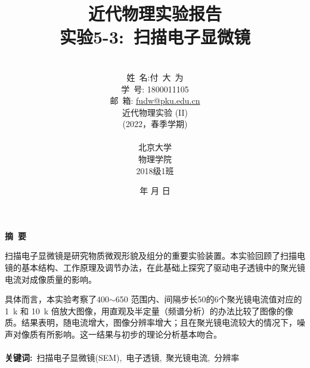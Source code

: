 \documentclass[a4paper]{article}
\begin{document}
\renewcommand{\contentsname}{目\ 录}
\renewcommand{\appendixname}{附录}
\renewcommand{\appendixpagename}{附录}
\renewcommand{\refname}{参考文献} 
\renewcommand{\figurename}{图}
\renewcommand{\tablename}{表}
\renewcommand{\today}{\number\year 年 \number\month 月 \number\day 日}
\newcommand{\refeq}[1]{\textbf{Eq.(\ref{#1})}}
\newcommand*{\circled}[1]{\lower.7ex\hbox{\tikz\draw (0pt, 0pt)%
    circle (.5em) node {\makebox[1em][c]{\small #1}};}}
    
\title{{\Huge 近代物理实验报告{\large\linebreak\\}}{\Large 实验5-3:\ 扫描电子显微镜\linebreak\linebreak}}
\author{\\姓\ 名:付\ 大\ 为\\
学\ 号: 1800011105\\
邮\ 箱: \url{fudw@pku.edu.cn}\\
近代物理实验 (II)\\
(2022，春季学期)\\\\
北京大学\\
物理学院\\
2018级1班}
\date{\today}
\maketitle
\newpage

\begin{center}
{\Large\bf{摘\ 要\\}}
\end{center}

扫描电子显微镜是研究物质微观形貌及组分的重要实验装置。本实验回顾了扫描电镜的基本结构、工作原理及调节办法，在此基础上探究了驱动电子透镜中的聚光镜电流对成像质量的影响。
	
具体而言，本实验考察了400$\sim$650 范围内、间隔步长50的6个聚光镜电流值对应的\SI{1}{k} 和 \SI{10}{k} 倍放大图像，用直观及半定量（频谱分析）的办法比较了图像的像质。结果表明，随电流增大，图像分辨率增大；且在聚光镜电流较大的情况下，噪声对像质有所影响。这一结果与初步的理论分析基本吻合。
\\\\
{\bf{关键词}:}\ 扫描电子显微镜(SEM),\ 电子透镜,\ 聚光镜电流,\ 分辨率

\newpage
\begin{center}
\tableofcontents\label{c}
\end{center}
\newpage
\end{document}
